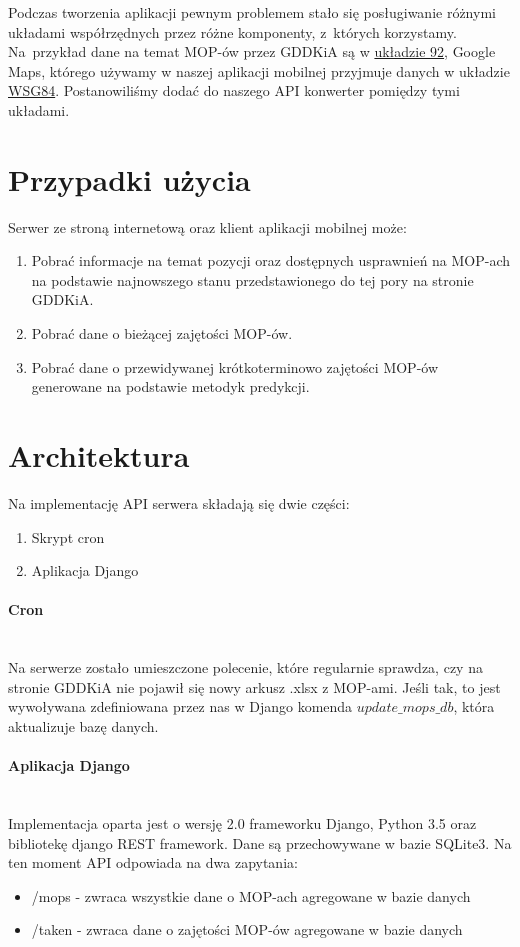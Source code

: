 Podczas tworzenia aplikacji pewnym problemem stało się posługiwanie różnymi układami współrzędnych przez różne komponenty, z~których korzystamy. Na~przykład dane na temat MOP-ów przez GDDKiA są w \href{https://pl.wikipedia.org/wiki/Uk\%C5\%82ad_wsp\%C3\%B3\%C5\%82rz\%C4\%99dnych_1992}{układzie 92}, Google Maps, którego używamy w naszej aplikacji mobilnej przyjmuje danych w układzie \href{https://pl.wikipedia.org/wiki/System_odniesienia_WGS_84}{WSG84}. Postanowiliśmy dodać do naszego API konwerter pomiędzy tymi układami.
\section{Przypadki użycia}
Serwer ze stroną internetową oraz klient aplikacji mobilnej może:
\begin{enumerate}
\item Pobrać informacje na temat pozycji oraz dostępnych usprawnień na MOP-ach na podstawie najnowszego stanu przedstawionego do tej pory na stronie GDDKiA.
\item Pobrać dane o bieżącej zajętości MOP-ów.
\item Pobrać dane o przewidywanej krótkoterminowo zajętości MOP-ów generowane na podstawie metodyk predykcji.
\end{enumerate}
\section{Architektura}
Na implementację API serwera składają się dwie części:
\begin{enumerate}
\item Skrypt cron
\item Aplikacja Django
\end{enumerate}
\paragraph{Cron}\mbox{}\\
Na serwerze zostało umieszczone polecenie, które regularnie sprawdza, czy na stronie GDDKiA nie pojawił się nowy arkusz .xlsx z MOP-ami. Jeśli tak, to jest wywoływana zdefiniowana przez nas w Django komenda $\textit{update\_mops\_db}$, która aktualizuje bazę danych.
\paragraph{Aplikacja Django}\mbox{}\\
Implementacja oparta jest o wersję 2.0 frameworku Django, Python 3.5 oraz bibliotekę django REST framework. Dane są przechowywane w bazie SQLite3. Na ten moment API odpowiada na dwa zapytania:
\begin{itemize}
\item /mops - zwraca wszystkie dane o MOP-ach agregowane w bazie danych
\item /taken - zwraca dane o zajętości MOP-ów agregowane w bazie danych
\end{itemize}


